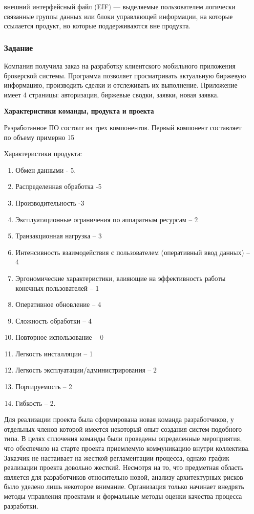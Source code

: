 внешний интерфейсный файл (EIF) — выделяемые пользователем логически связанные группы данных или блоки управляющей информации, на которые ссылается продукт, но которые поддерживаются вне продукта.

\subsubsection{Задание}

Компания получила заказ на разработку клиентского мобильного приложения брокерской системы. Программа позволяет просматривать актуальную биржевую информацию, производить сделки и отслеживать их выполнение.
Приложение имеет 4 страницы: авторизация, биржевые сводки, заявки, новая заявка.

\textbf{Характеристики команды, продукта и проекта}

Разработанное ПО состоит из трех компонентов. Первый компонент составляет по объему примерно 15%

Характеристики продукта: 

\begin{enumerate}
	\item Обмен данными - 5. 
	\item Распределенная обработка -5
	\item Производительность -3
	\item Эксплуатационные ограничения по аппаратным ресурсам – 2 
	\item Транзакционная нагрузка – 3
	\item Интенсивность взаимодействия с пользователем (оперативный ввод данных) – 4
	\item Эргономические характеристики, влияющие на эффективность работы конечных пользователей – 1
	\item Оперативное обновление – 4
	\item Сложность обработки – 4
	\item Повторное использование – 0
	\item Легкость инсталляции – 1
	\item Легкость эксплуатации/администрирования – 2
	\item Портируемость – 2
	\item Гибкость – 2.
\end{enumerate}

Для реализации проекта была сформирована новая команда разработчиков, у отдельных членов которой имеется некоторый опыт создания систем подобного типа. В целях сплочения команды были проведены определенные мероприятия, что обеспечило на старте проекта приемлемую коммуникацию внутри коллектива. Заказчик не настаивает на жесткой регламентации процесса, однако график реализации проекта довольно жесткий. Несмотря на то, что предметная область является для разработчиков относительно новой, анализу архитектурных рисков было уделено лишь некоторое внимание. Организация только начинает внедрять методы управления проектами и формальные методы оценки качества процесса разработки. 

